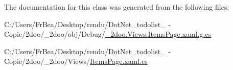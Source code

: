 The documentation for this class was generated from the following files:\begin{CompactItemize}
\item 
C:/Users/FrBea/Desktop/rendu/DotNet\_\-todolist\_ - Copie/2doo/\_\-2doo/obj/Debug/\hyperlink{__2doo_8_views_8_items_page_8xaml_8g_8cs}{\_\-2doo.Views.ItemsPage.xaml.g.cs}\item 
C:/Users/FrBea/Desktop/rendu/DotNet\_\-todolist\_ - Copie/2doo/\_\-2doo/Views/\hyperlink{_items_page_8xaml_8cs}{ItemsPage.xaml.cs}\end{CompactItemize}
